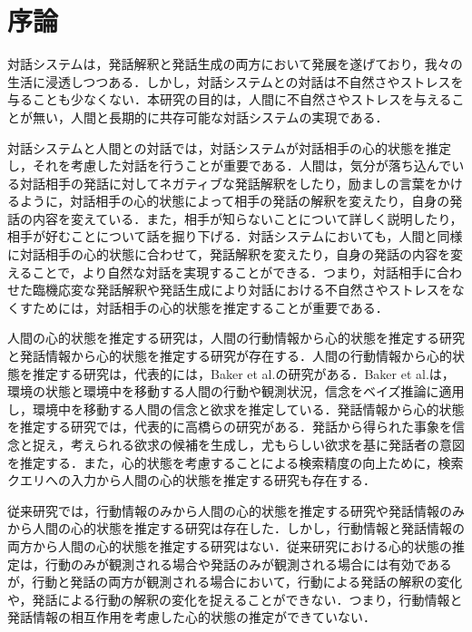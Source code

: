\chapter{序論}

\par
対話システムは，発話解釈と発話生成の両方において発展を遂げており，我々の生活に浸透しつつある．しかし，対話システムとの対話は不自然さやストレスを与ることも少なくない．本研究の目的は，人間に不自然さやストレスを与えることが無い，人間と長期的に共存可能な対話システムの実現である．

\par
対話システムと人間との対話では，対話システムが対話相手の心的状態を推定し，それを考慮した対話を行うことが重要である．人間は，気分が落ち込んでいる対話相手の発話に対してネガティブな発話解釈をしたり，励ましの言葉をかけるように，対話相手の心的状態によって相手の発話の解釈を変えたり，自身の発話の内容を変えている．また，相手が知らないことについて詳しく説明したり，相手が好むことについて話を掘り下げる．対話システムにおいても，人間と同様に対話相手の心的状態に合わせて，発話解釈を変えたり，自身の発話の内容を変えることで，より自然な対話を実現することができる．つまり，対話相手に合わせた臨機応変な発話解釈や発話生成により対話における不自然さやストレスをなくすためには，対話相手の心的状態を推定することが重要である．

\par
人間の心的状態を推定する研究は，人間の行動情報から心的状態を推定する研究と発話情報から心的状態を推定する研究が存在する．人間の行動情報から心的状態を推定する研究は，代表的には，Baker et al.の研究がある．Baker et al.は，環境の状態と環境中を移動する人間の行動や観測状況，信念をベイズ推論に適用し，環境中を移動する人間の信念と欲求を推定している．発話情報から心的状態を推定する研究では，代表的に高橋らの研究がある．発話から得られた事象を信念と捉え，考えられる欲求の候補を生成し，尤もらしい欲求を基に発話者の意図を推定する．また，心的状態を考慮することによる検索精度の向上ために，検索クエリへの入力から人間の心的状態を推定する研究も存在する．

\par
従来研究では，行動情報のみから人間の心的状態を推定する研究や発話情報のみから人間の心的状態を推定する研究は存在した．しかし，行動情報と発話情報の両方から人間の心的状態を推定する研究はない．従来研究における心的状態の推定は，行動のみが観測される場合や発話のみが観測される場合には有効であるが，行動と発話の両方が観測される場合において，行動による発話の解釈の変化や，発話による行動の解釈の変化を捉えることができない．つまり，行動情報と発話情報の相互作用を考慮した心的状態の推定ができていない．

